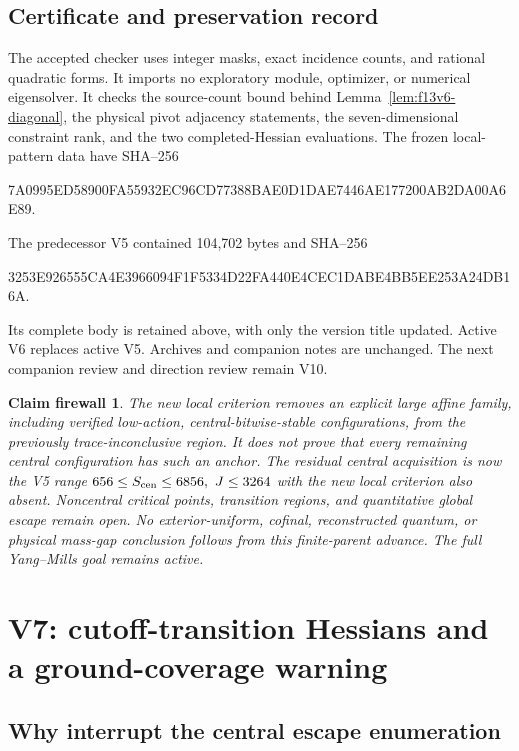\documentclass[11pt,oneside]{article}
\newtheorem{firewall}[theorem]{Claim firewall}
\begin{document}
\subsection{Certificate and preservation record}

The accepted checker
uses integer masks, exact incidence counts,
and rational quadratic forms. It imports
no exploratory module, optimizer, or numerical
eigensolver. It checks the source-count bound
behind Lemma~\ref{lem:f13v6-diagonal}, the
physical pivot adjacency statements, the
seven-dimensional constraint rank, and the
two completed-Hessian evaluations.
The frozen local-pattern data have SHA--256
\begin{center}\scriptsize\ttfamily
7A0995ED58900FA55932EC96CD77388BAE0D1DAE7446AE177200AB2DA00A6E89.
\end{center}

The predecessor V5 contained 104,702 bytes
and SHA--256
\begin{center}\scriptsize\ttfamily
3253E926555CA4E3966094F1F5334D22FA440E4CEC1DABE4BB5EE253A24DB16A.
\end{center}
Its complete body is retained above, with
only the version title updated. Active V6
replaces active V5. Archives and companion
notes are unchanged. The next companion
review and direction review remain V10.

\begin{firewall}
The new local criterion removes an explicit
large affine family, including verified
low-action, central-bitwise-stable configurations,
from the previously trace-inconclusive region.
It does not prove that every remaining central
configuration has such an anchor. The residual
central acquisition is now the V5 range
\(656\le S_{\rm cen}\le6856,\ J\le3264\)
with the new local criterion also absent.
Noncentral critical points, transition regions,
and quantitative global escape remain open.
No exterior-uniform, cofinal, reconstructed
quantum, or physical mass-gap conclusion
follows from this finite-parent advance.
The full Yang--Mills goal remains active.
\end{firewall}
\section{V7: cutoff-transition Hessians and a ground-coverage warning}
\label{sec:f13v7}

\subsection{Why interrupt the central escape enumeration}
\end{document}
